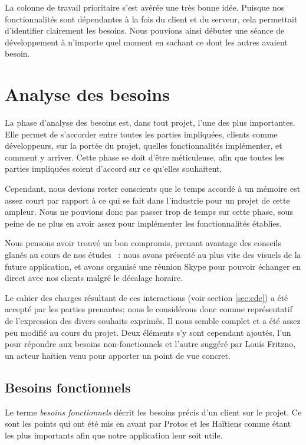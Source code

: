 \documentclass{EPL-master-thesis-covers-FR}
\begin{document}
				La colonne de travail prioritaire s'est avérée une très bonne idée. Puisque nos fonctionnalités sont dépendantes à la fois du client et du serveur, cela permettait d'identifier clairement les besoins. Nous pouvions ainsi débuter une séance de développement à n'importe quel moment en sachant ce dont les autres avaient besoin.

	\chapter{Analyse des besoins}
		\label{sec:analyse_besoins}


		La phase d'analyse des besoins est, dans tout projet, l'une des plus importantes. Elle permet de s'accorder entre toutes les parties impliquées, clients comme développeurs, sur la portée du projet, quelles fonctionnalités implémenter, et comment y arriver. Cette phase se doit d'être méticuleuse, afin que toutes les parties impliquées soient d'accord sur ce qu'elles souhaitent.

		Cependant, nous devions rester conscients que le temps accordé à un mémoire est assez court par rapport à ce qui se fait dans l'industrie pour un projet de cette ampleur. Nous ne pouvions donc pas passer trop de temps sur cette phase, sous peine de ne plus en avoir assez pour implémenter les fonctionnalités établies.

		Nous pensons avoir trouvé un bon compromis, prenant avantage des conseils glanés au cours de nos études~\cite{ref:kim_coo} : nous avons présenté au plus vite des visuels de la future application, et avons organisé une réunion Skype pour pouvoir échanger en direct avec nos clients malgré le décalage horaire.

		Le cahier des charges résultant de ces interactions (voir section \ref{sec:cdc}) a été accepté par les parties prenantes; nous le considérons donc comme représentatif de l'expression des divers souhaits exprimés. Il nous semble complet et a été assez peu modifié au cours du projet. Deux éléments s'y sont cependant ajoutés, l'un pour répondre aux besoins non-fonctionnels et l'autre suggéré par Louis Fritzno, un acteur haïtien venu pour apporter un point de vue concret.

		\section{Besoins fonctionnels}

			Le terme \emph{besoins fonctionnels} décrit les besoins précis d'un client sur le projet. Ce sont les points qui ont été mis en avant par Protos et les Haïtiens comme étant les plus importants afin que notre application leur soit utile.
\end{document}
